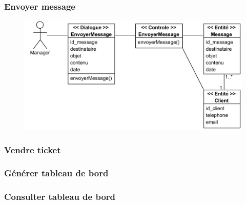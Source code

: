         \subsubsection[Envoyer message]{Envoyer message}
            \begin{figure}[H]
                \centering
                \includegraphics[width=130mm]{images/diagrammes-de-classes-participantes/envoyer-message Class Diagram.png}
                \label{fig:cpEnvSms}
            \end{figure}
        \subsubsection[Vendre billet]{Vendre ticket}
        \subsubsection[Générer tableau de bord]{Générer tableau de bord}
        \subsubsection[Consulter tableau de bord]{Consulter tableau de bord}
        